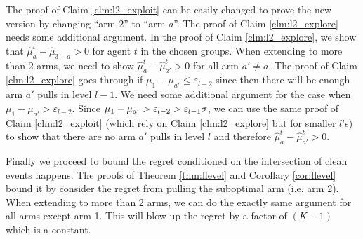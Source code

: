 The proof of Claim \ref{clm:l2_exploit} can be easily changed to prove the new version by changing ``arm 2'' to ``arm $a$''. The proof of Claim \ref{clm:l2_explore} needs some additional argument. In the proof of Claim \ref{clm:l2_explore}, we show that $\hat{\mu}_a^t - \hat{\mu}_{3-a} > 0 $ for agent $t$ in the chosen groups. When extending to more than 2 arms, we need to show $\hat{\mu}_a^t - \hat{\mu}_{a'}^t > 0$ for all arm $a' \neq a$. The proof of Claim \ref{clm:l2_explore} goes through if $\mu_1- \mu_{a'} \leq \varepsilon_{l-2}$ since then there will be enough arm $a'$ pulls in level $l-1$. We need some additional argument for the case when $\mu_1 - \mu_{a'} > \varepsilon_{l-2}$. Since $\mu_1- \mu_{a'} > \varepsilon_{l-2} > \varepsilon_{l-1}\sigma$, we can use the same proof of Claim \ref{clm:l2_exploit} (which rely on Claim \ref{clm:l2_explore} but for smaller $l$'s) to show that there are no arm $a'$ pulls in level $l$ and therefore $\hat{\mu}_a^t - \hat{\mu}_{a'}^t > 0$. 

Finally we proceed to bound the regret conditioned on the intersection of clean events happens. The proofs of Theorem \ref{thm:llevel} and Corollary \ref{cor:llevel} bound it by consider the regret from pulling the suboptimal arm (i.e. arm 2). When extending to more than 2 arms, we can do the exactly same argument for all arms except arm 1. This will blow up the regret by a factor of $(K-1)$ which is a constant.

 

